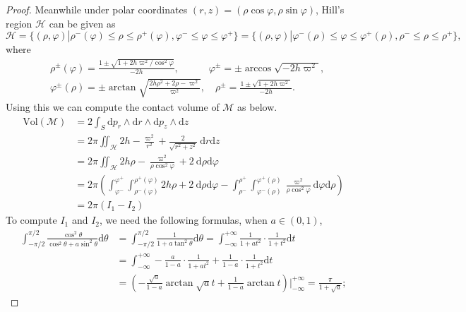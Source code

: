 \documentclass[11pt]{amsart}
\newcommand{\om}{\varpi}
\begin{document}
\begin{proof}
	Meanwhile under polar coordinates $(r,z)=(\rho\cos\varphi,\rho\sin\varphi)$, Hill's region $\mathcal{H}$ can be given as
    $$\mathcal{H}=\{(\rho,\varphi)|\rho^-(\varphi)\leq\rho\leq\rho^+(\varphi), \varphi^-\leq\varphi\leq\varphi^+\}=\{(\rho,\varphi)|\varphi^-(\rho)\leq\varphi\leq\varphi^+(\rho), \rho^-\leq\rho\leq\rho^+\},$$
    where 
	$$\begin{aligned}
		&\rho^{\pm}(\varphi)=\frac{1\pm\sqrt{1+2h\om^2/\cos^2\varphi}}{-2h},\qquad \quad \varphi^{\pm}=\pm\arccos\sqrt{-2h\om^2},\\
		&\varphi^{\pm}(\rho)=\pm\arctan\sqrt{\frac{2h\rho^2+2\rho-\om^{2}}{\om^2}},\quad \rho^{\pm}=\frac{1\pm\sqrt{1+2h\om^2}}{-2h}.
	\end{aligned}$$
    Using this we can compute the contact volume of $\mathcal{M}$ as below. 
	\begin{equation}
		\begin{aligned}
			\text{Vol}(\mathcal{M})&=2\int_{S}\mathrm{d}p_{r}\wedge\mathrm{d}r\wedge\mathrm{d}p_{z}\wedge\mathrm{d}z\\
			&=2\pi\iint_{\mathcal{H}}2h-\frac{\om^{2}}{r^{2}}+\frac{2}{\sqrt{r^{2}+z^{2}}}\ \mathrm{d}r\mathrm{d}z\\
			&=2\pi\iint_{\mathcal{H}}2h\rho-\frac{\om^{2}}{\rho\cos^{2}\varphi}+2\ \mathrm{d}\rho\mathrm{d}\varphi\\
			&=2\pi\left(\int_{\varphi^-}^{\varphi^+}\int_{\rho^-(\varphi)}^{\rho^+(\varphi)}2h\rho+2\ \mathrm{d}\rho \mathrm{d}\varphi-\int_{\rho^-}^{\rho^+}\int_{\varphi^-(\rho)}^{\varphi^+(\rho)}\frac{\om^2}{\rho\cos^2\varphi} \mathrm{d}\varphi \mathrm{d}\rho\right)\\
			&=2\pi\left(I_{1}-I_{2}\right)
		\end{aligned}
	\end{equation}
	To compute $I_1$ and $I_2$, we need the following formulas, when $a\in(0,1)$,
	\begin{equation}\label{formula 1}
		\begin{aligned}
			\int_{-\pi\slash2}^{\pi\slash2}\frac{\cos^2\theta}{\cos^2\theta+a\sin^{2}\theta}\mathrm{d} \theta&=\int_{-\pi\slash2}^{\pi\slash2}\frac{1}{1+a\tan^{2}\theta}\mathrm{d} \theta=\int_{-\infty}^{+\infty}\frac{1}{1+at^2}\cdot\frac{1}{1+t^2}\mathrm{d}t\\
			&=\int_{-\infty}^{+\infty}-\frac{a}{1-a}\cdot\frac{1}{1+at^2}+\frac{1}{1-a}\cdot\frac{1}{1+t^2}\mathrm{d}t\\
			&=\left(-\frac{\sqrt{a}}{1-a}\arctan\sqrt{a}t+\frac{1}{1-a}\arctan t \right)\bigg|^{+\infty}_{-\infty}=\frac{\pi}{1+\sqrt{a}};

\end{aligned}
\end{equation}
\end{proof}
\end{document}
